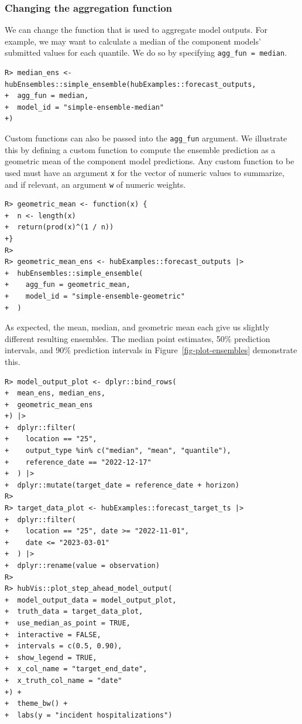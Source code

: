 \documentclass[
  article,
  shortnames,
  notitle]{jss}
\begin{document}
\subsubsection{Changing the aggregation
function}\label{changing-the-aggregation-function}

We can change the function that is used to aggregate model outputs. For
example, we may want to calculate a median of the component models'
submitted values for each quantile. We do so by specifying
\texttt{agg\_fun\ =\ median}.

\begin{verbatim}
R> median_ens <- hubEnsembles::simple_ensemble(hubExamples::forecast_outputs,
+  agg_fun = median,
+  model_id = "simple-ensemble-median"
+)
\end{verbatim}

Custom functions can also be passed into the \texttt{agg\_fun} argument.
We illustrate this by defining a custom function to compute the ensemble
prediction as a geometric mean of the component model predictions. Any
custom function to be used must have an argument \texttt{x} for the
vector of numeric values to summarize, and if relevant, an argument
\texttt{w} of numeric weights.

\begin{verbatim}
R> geometric_mean <- function(x) {
+  n <- length(x)
+  return(prod(x)^(1 / n))
+}
R> 
R> geometric_mean_ens <- hubExamples::forecast_outputs |>
+  hubEnsembles::simple_ensemble(
+    agg_fun = geometric_mean,
+    model_id = "simple-ensemble-geometric"
+  )
\end{verbatim}

As expected, the mean, median, and geometric mean each give us slightly
different resulting ensembles. The median point estimates, 50\%
prediction intervals, and 90\% prediction intervals in
Figure~\ref{fig-plot-ensembles} demonstrate this.

\begin{verbatim}
R> model_output_plot <- dplyr::bind_rows(
+  mean_ens, median_ens,
+  geometric_mean_ens
+) |>
+  dplyr::filter(
+    location == "25",
+    output_type %in% c("median", "mean", "quantile"),
+    reference_date == "2022-12-17"
+  ) |>
+  dplyr::mutate(target_date = reference_date + horizon)
R> 
R> target_data_plot <- hubExamples::forecast_target_ts |>
+  dplyr::filter(
+    location == "25", date >= "2022-11-01",
+    date <= "2023-03-01"
+  ) |>
+  dplyr::rename(value = observation)
R> 
R> hubVis::plot_step_ahead_model_output(
+  model_output_data = model_output_plot,
+  truth_data = target_data_plot,
+  use_median_as_point = TRUE,
+  interactive = FALSE,
+  intervals = c(0.5, 0.90),
+  show_legend = TRUE,
+  x_col_name = "target_end_date", 
+  x_truth_col_name = "date"
+) +
+  theme_bw() +
+  labs(y = "incident hospitalizations")
\end{verbatim}
\end{document}
